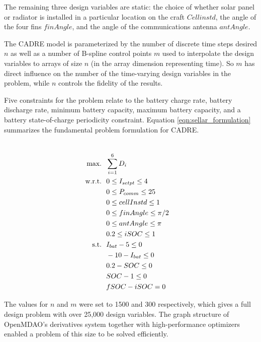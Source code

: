 \documentclass[]{aiaa-tc} %
\newcommand{\txt}{\textrm}
\begin{document}
The remaining three design variables are static: the choice of whether solar panel or radiator is installed in a
particular location on the craft $Cellinstd$, the angle of the four fins $finAngle$, and the angle of the
communications antenna $antAngle$.

The CADRE model is parameterized by the number of discrete time steps desired $n$ as well as a number of B-spline
control points $m$ used to interpolate the design variables to arrays of size $n$ (in the array dimension
representing time). So $m$ has direct influence on the number of the time-varying design variables in the problem,
while $n$ controls the fidelity of the results.

Five constraints for the problem relate to the battery charge rate, battery discharge rate, minimum
battery capacity, maximum battery capacity, and a battery state-of-charge periodicity constraint. Equation \ref{eqn:sellar_formulation} summarizes the fundamental problem formulation for CADRE.

        \begin{align}
            \\\txt{max.} &\ \ \sum_{i=1}^6 D_i \notag
            \\\txt{w.r.t.} & \ \ 0 \le I_{setpt} \le 4 \notag
            \\     & \ \ 0 \le P_{comm} \le 25 \notag
            \\     & \ \ 0 \le cellInstd \le 1 \notag
            \\     & \ \ 0 \le finAngle \le \pi/2 \notag
            \\     & \ \ 0 \le antAngle \le \pi \notag
            \\     & \ \ 0.2 \le iSOC \le 1 \notag
            \\\txt{s.t.} & \ \ I_{bat} - 5 \le 0 \notag
            \\     & \ \ -10 - I_{bat} \le 0 \notag
            \\     & \ \ 0.2 - SOC \le 0 \notag
            \\     & \ \ SOC - 1 \le 0 \notag
            \\     & \ \ fSOC - iSOC = 0 \notag
            \label{eqn:sellar_formulation}
        \end{align}


The values for $n$ and $m$ were set to 1500 and 300 respectively, which gives a full design problem with over
25,000 design variables. The graph structure of OpenMDAO's derivatives system together with high-performance
optimizers enabled a problem of this size to be solved efficiently.
\end{document}
